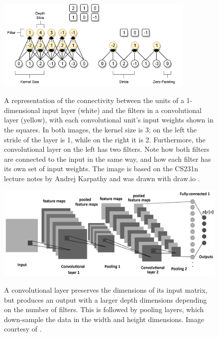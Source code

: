 \documentclass[12pt, titlepage]{report}
\theoremstyle{definition}
\begin{document}
\begin{figure}
    \centering
    \includegraphics[width=0.85\textwidth]{img/convolution.png}\\
    \caption[Convolutional layer connection topology]{A representation of the connectivity between the units of a 1-dimensional input layer (white) and the filters in a convolutional layer (yellow), with each convolutional unit's input weights shown in the squares. In both images, the kernel size is 3; on the left the stride of the layer is 1, while on the right it is 2. Furthermore, the convolutional layer on the left has two filters. Note how both filters are connected to the input in the same way, and how each filter has its own set of input weights. The image is based on the CS231n lecture notes by Andrej Karpathy \cite[Convolutional Neural Networks: Architectures, Convolution / Pooling Layers]{karpathy2017cs231n} and was drawn with draw.io \cite{jgraph2018draw}.}
    \label{figure:convolution1d}
\end{figure}

\begin{figure}
\centering
\includegraphics[width=1\textwidth]{img/conv_pooling.png}\\
\caption[Convolutional neural network structure]{A convolutional layer preserves the dimensions of its input matrix, but produces an output with a larger depth dimensions depending on the number of filters. This is followed by pooling layers, which down-sample the data in the width and height dimensions. Image courtesy of \cite{albelwi2017framework}.}
\label{figure:conv_pooling}
\end{figure}
\end{document}
